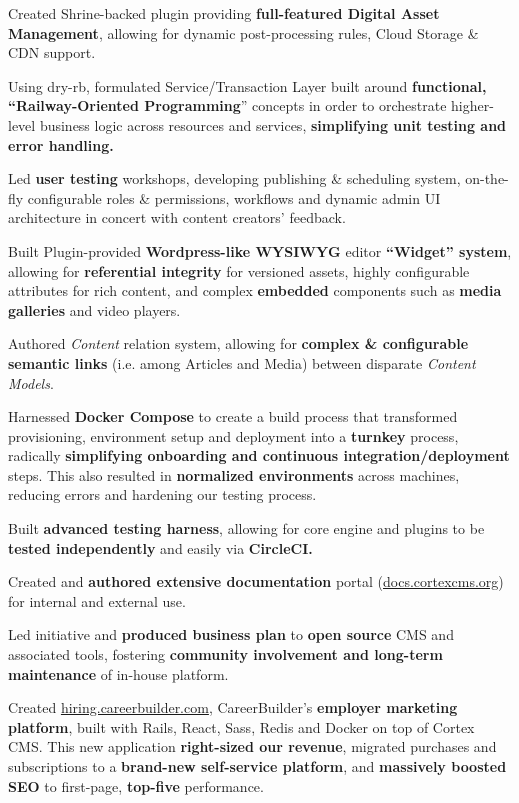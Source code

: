 \begin{cventries}
{\begin{cvitems}
        \item {Created Shrine-backed plugin providing \textbf{full-featured Digital Asset Management}, allowing for dynamic post-processing rules, Cloud Storage \& CDN support.}
        \item {Using dry-rb, formulated Service/Transaction Layer built around \textbf{functional, “Railway-Oriented Programming}” concepts in order to orchestrate higher-level business logic across resources and services, \textbf{simplifying unit testing and error handling.}}
        \item {Led \textbf{user testing} workshops, developing publishing \& scheduling system, on-the-fly configurable roles \& permissions, workflows and dynamic admin UI architecture in concert with content creators’ feedback.}
        \item {Built Plugin-provided \textbf{Wordpress-like WYSIWYG} editor \textbf{“Widget” system}, allowing for \textbf{referential integrity} for versioned assets, highly configurable attributes for rich content, and complex \textbf{embedded} components such as \textbf{media galleries} and video players.}
        \item {Authored \textit{Content} relation system, allowing for \textbf{complex \& configurable semantic links} (i.e. among Articles and Media) between disparate \textit{Content Models}.}
        \item {Harnessed \textbf{Docker Compose} to create a build process that transformed provisioning, environment setup and deployment into a \textbf{turnkey} process, radically \textbf{simplifying onboarding and continuous integration/deployment} steps. This also resulted in \textbf{normalized environments} across machines, reducing errors and hardening our testing process.}
        \item {Built \textbf{advanced testing harness}, allowing for core engine and plugins to be \textbf{tested independently} and easily via \textbf{CircleCI.}}
        \item {Created and \textbf{authored extensive documentation} portal (\url{docs.cortexcms.org}) for internal and external use.}
        \item {Led initiative and \textbf{produced business plan} to \textbf{open source} CMS and associated tools, fostering \textbf{community involvement and long-term maintenance} of in-house platform.}
        \\[2mm]
        \item {Created \url{hiring.careerbuilder.com}, CareerBuilder’s \textbf{employer marketing platform}, built with Rails, React, Sass, Redis and Docker on top of Cortex CMS. This new application \textbf{right-sized our revenue}, migrated purchases and subscriptions to a \textbf{brand-new self-service platform}, and \textbf{massively boosted SEO} to first-page, \textbf{top-five} performance.}

\end{cvitems}}
\end{cventries}
